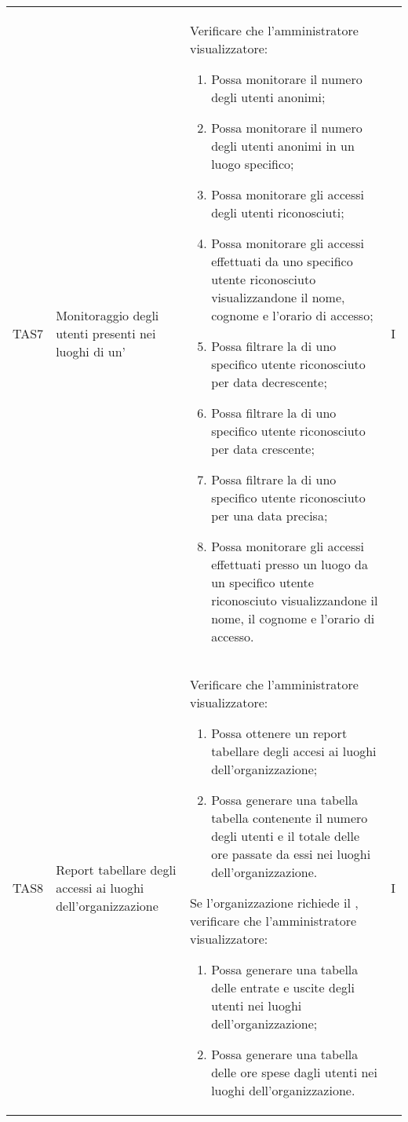 {\begin{longtable}{ c  C{2.5cm}  C{10cm} C{1cm}}
TAS7 & Monitoraggio degli utenti presenti nei luoghi di un' &
Verificare che l'amministratore visualizzatore:
\begin{enumerate}[resume]
    \item Possa monitorare il numero degli utenti anonimi;
    \item Possa monitorare il numero degli utenti anonimi in un luogo specifico;
    \item Possa monitorare gli accessi degli utenti riconosciuti;
    \item Possa monitorare gli accessi effettuati da uno specifico utente riconosciuto visualizzandone il nome, cognome e l'orario di accesso;
    \item Possa filtrare la  di uno specifico utente riconosciuto per data decrescente;
    \item Possa filtrare la  di uno specifico utente riconosciuto per data crescente;
    \item Possa filtrare la  di uno specifico utente riconosciuto per una data precisa;
    \item Possa monitorare gli accessi effettuati presso un luogo da un specifico utente riconosciuto visualizzandone il nome, il cognome e l’orario di accesso.
\end{enumerate} & I \\

TAS8 & Report tabellare degli accessi ai luoghi dell'organizzazione &
Verificare che l'amministratore visualizzatore:
\begin{enumerate}
    \item Possa ottenere un report tabellare degli accesi ai luoghi dell'organizzazione;
    \item Possa generare una tabella tabella contenente il numero degli utenti e il totale delle ore passate da essi nei luoghi dell’organizzazione.
\end{enumerate}
Se l'organizzazione richiede il , verificare che l'amministratore visualizzatore:
\begin{enumerate}[resume]
    \item Possa generare una tabella delle entrate e uscite degli utenti nei luoghi dell'organizzazione;
    \item Possa generare una tabella delle ore spese dagli utenti nei luoghi dell'organizzazione.
\end{enumerate} & I \\


\end{longtable}}
